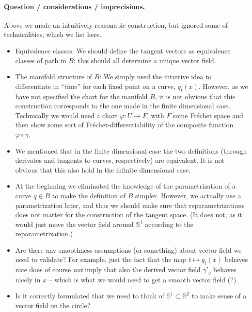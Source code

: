 \documentclass[a4,danish]{article}
\newcommand{\R}{\mathbb{R}}
\renewcommand{\S}{\mathbb{S}}
\renewcommand{\phi}{\varphi}
\begin{document}
\paragraph{Question / considerations / imprecisions.}
Above we made an intuitively reasonable construction, but ignored some
of technicalities, which we list here.
\begin{itemize}
\item Equivalence classes: We should define the tangent vectors as
  equivalence classes of path in $B$; this should all determine a
  unique vector field.
\item The manifold structure of $B$: We simply used the intuitive idea
  to differentiate in ``time'' for each fixed point on a curve,
  $q_t(x)$. However, as we have not specified the chart for the
  manifold $B$, it is not obvious that this construction corresponds
  to the one made in the finite dimensional case. Technically we
  would need a chart $\phi \colon U \rightarrow F$, with $F$ some
  Fr\'echet space and then show some sort of Fr\'echet-differentiability of the
  composite function $\phi \circ \gamma$.
\item We mentioned that in the finite dimensional case the two
  definitions (through derivates and tangents to curves, respectively)
  are equivalent. It is not obvious that this also hold in the
  infinite dimensional case.
\item At the beginning we eliminated the knowledge of the
  parametrization of a curve $q \in B$ to make the definition of $B$
  simpler. However, we actually use a parametrization later, and thus
  we should make sure that reparametrizations does not matter for the
  construction of the tangent space. (It does not, as it would just
  move the vector field around $\S^1$ according to the
  reparametrization.)
\item Are there any smoothness assumptions (or something) about vector
  field we need to validate? For example, just the fact that the map
  $t \mapsto q_t(x)$ behaves nice does of course \textit{not} imply
  that also the derived vector field $\gamma'_q$ behaves nicely in
  $x$ -- which is what we would need to get a smooth vector field
  (?).
\item Is it correctly formulated that we need to think of $\S^1
  \subset \R^2$ to make sense of a vector field on the circle?
\end{itemize}


\end{document}
